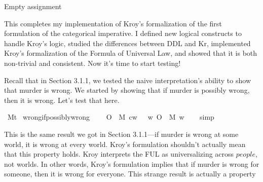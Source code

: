 \begin{isabellebody}
{  Empty assignment\color{black}%
}%
\endisatagproof
{\isafoldproof}%
%
\isadelimproof
%
\endisadelimproof
%
\begin{isamarkuptext}%
This completes my implementation of Kroy's formalization of the first formulation of the 
categorical imperative. I defined new logical constructs to handle Kroy's logic, studied the differences
between DDL and Kr, implemented Kroy's formalization of the Formula of Universal Law, and showed 
that it is both non-trivial and consistent. Now it's time to start testing!%
\end{isamarkuptext}\isamarkuptrue%
%
\isadelimdocument
%
\endisadelimdocument
%
\isatagdocument
%
\isamarkuptrue%
%
\endisatagdocument
{\isafolddocument}%
%
\isadelimdocument
%
\endisadelimdocument
%
\begin{isamarkuptext}%
Recall that in Section 3.1.1, we tested the naive interpretation's ability to show that murder 
is wrong. We started by showing that if murder is possibly wrong, then it is wrong. Let's test that 
here.%
\end{isamarkuptext}\isamarkuptrue%
\isamarkupfalse%
\ M{\isacharcolon}{\isacharcolon}{\isachardoublequoteopen}t{\isachardoublequoteclose}\isanewline
%
\isanewline
\isanewline
{}\isamarkupfalse%
\ wrong{\isacharunderscore}if{\isacharunderscore}possibly{\isacharunderscore}wrong{\isacharcolon}\isanewline
\ \ \ {\isachardoublequoteopen}{\isacharparenleft}{\isacharparenleft}{\isasymdiamond}\ {\isacharparenleft}O\ {\isacharbraceleft}\isactrlbold {\isasymnot}\ M{\isacharbraceright}{\isacharparenright}{\isacharparenright}\ cw{\isacharparenright}\ {\isasymlongrightarrow}\ \ {\isacharparenleft}{\isasymforall}w{\isachardot}\ {\isacharparenleft}O\ {\isacharbraceleft}\isactrlbold {\isasymnot}\ M{\isacharbraceright}{\isacharparenright}\ w{\isacharparenright}{\isachardoublequoteclose}\isanewline
%
\isadelimproof
\ \ %
\endisadelimproof
%
\isatagproof
{}\isamarkupfalse%
\ simp%
\endisatagproof
{\isafoldproof}%
%
\isadelimproof
%
\endisadelimproof
%
\begin{isamarkuptext}%
This is the same result we got in Section 3.1.1—if murder is wrong at some world, it is wrong at
every world. Kroy's formulation shouldn't actually mean that this property holds. Kroy interprets the 
FUL as universalizing across $people$, not worlds. In other words, Kroy's formulation implies that if
murder is wrong for someone, then it is wrong for everyone. This strange result is actually a property 

\end{isamarkuptext}
\end{isabellebody}
